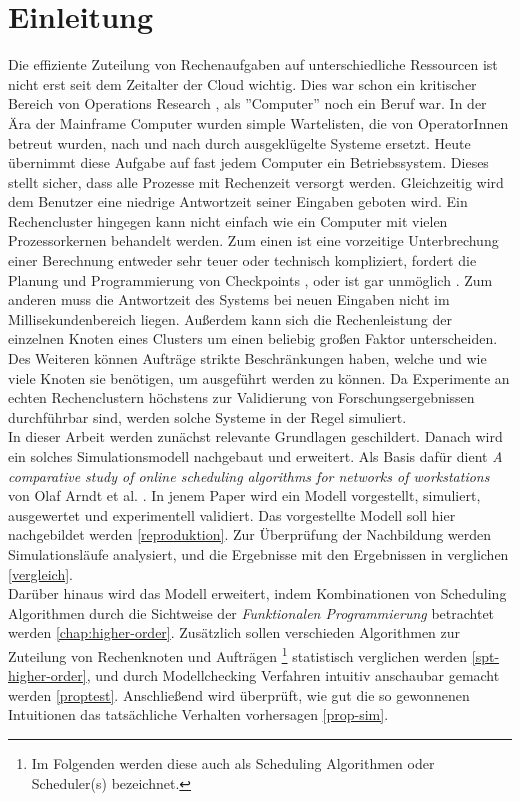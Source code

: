 \chapter{Einleitung}
\label{chap:ein}


Die effiziente Zuteilung von Rechenaufgaben auf unterschiedliche Ressourcen ist nicht erst seit dem Zeitalter der Cloud wichtig. Dies war schon ein kritischer Bereich von Operations Research
, als ''Computer'' noch ein Beruf war.
In der Ära der Mainframe Computer wurden simple Wartelisten, die von OperatorInnen betreut wurden, nach und nach durch ausgeklügelte Systeme ersetzt. %
Heute übernimmt diese Aufgabe auf fast jedem Computer ein Betriebssystem. Dieses stellt sicher, dass alle Prozesse mit Rechenzeit versorgt werden. Gleichzeitig wird dem Benutzer eine niedrige Antwortzeit seiner Eingaben geboten wird. Ein Rechencluster hingegen kann nicht einfach wie ein Computer mit vielen Prozessorkernen behandelt werden. Zum einen ist eine vorzeitige Unterbrechung einer Berechnung entweder sehr teuer oder technisch kompliziert, fordert die Planung und Programmierung von Checkpoints \cite{IPS15}, oder ist gar unmöglich \cite{adams1979hitchhiker}.
Zum anderen muss die Antwortzeit des Systems bei neuen Eingaben nicht im Millisekundenbereich liegen.
Außerdem kann sich die Rechenleistung der einzelnen Knoten eines Clusters um einen beliebig großen Faktor unterscheiden.
Des Weiteren können Aufträge strikte Beschränkungen haben, welche und  wie viele Knoten sie benötigen, um ausgeführt werden zu können.
Da Experimente an echten Rechenclustern höchstens zur Validierung von Forschungsergebnissen durchführbar sind, werden solche Systeme in der Regel simuliert.\\
In dieser Arbeit werden zunächst relevante Grundlagen geschildert.
Danach wird ein solches Simulationsmodell nachgebaut und erweitert. Als Basis dafür dient \emph{A comparative study of online scheduling algorithms for networks of workstations} von Olaf Arndt et al. \cite{Arn99}. In jenem Paper wird ein Modell vorgestellt, simuliert, ausgewertet und experimentell validiert. Das vorgestellte Modell soll hier nachgebildet werden \ref{reproduktion}. Zur Überprüfung der Nachbildung werden Simulationsläufe analysiert, und die Ergebnisse mit den Ergebnissen in \cite{Arn99} verglichen \ref{vergleich}.\\
Darüber hinaus wird das Modell erweitert, indem Kombinationen von Scheduling Algorithmen durch die Sichtweise der \emph{Funktionalen Programmierung} betrachtet werden \ref{chap:higher-order}.
Zusätzlich sollen verschieden Algorithmen zur Zuteilung von Rechenknoten und Aufträgen \footnote{Im Folgenden werden diese auch als Scheduling Algorithmen oder Scheduler(s) bezeichnet.} statistisch verglichen werden \ref{spt-higher-order}, und durch Modellchecking Verfahren intuitiv anschaubar gemacht werden \ref{proptest}. Anschließend wird überprüft, wie gut die so gewonnenen Intuitionen das tatsächliche Verhalten vorhersagen \ref{prop-sim}.\\



